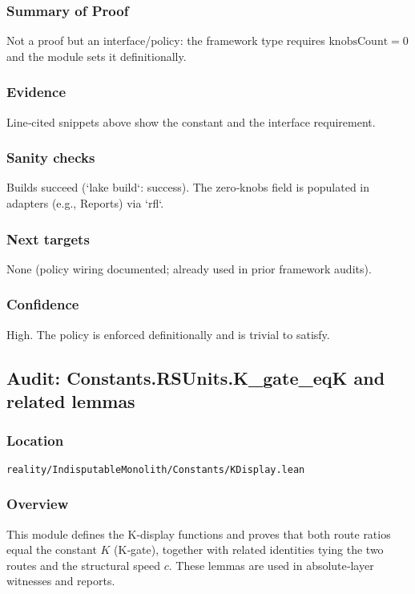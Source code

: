 \documentclass{article}
\newcommand{\FileRef}[1]{\texttt{#1}}
\begin{document}
\subsubsection{Summary of Proof}
Not a proof but an interface/policy: the framework type requires \(\mathrm{knobsCount}=0\) and the module sets it definitionally.

\subsubsection{Evidence}
Line‑cited snippets above show the constant and the interface requirement.

\subsubsection{Sanity checks}
Builds succeed (`lake build`: success). The zero‑knobs field is populated in adapters (e.g., Reports) via `rfl`.

\subsubsection{Next targets}
None (policy wiring documented; already used in prior framework audits).

\subsubsection{Confidence}
High. The policy is enforced definitionally and is trivial to satisfy.

\subsection{Audit: Constants.RSUnits.K\_gate\_eqK and related lemmas}
\subsubsection{Location}
\FileRef{reality/IndisputableMonolith/Constants/KDisplay.lean}

\subsubsection{Overview}
This module defines the K‑display functions and proves that both route ratios equal the constant \(K\) (K‑gate), together with related identities tying the two routes and the structural speed \(c\). These lemmas are used in absolute‑layer witnesses and reports.
\end{document}
